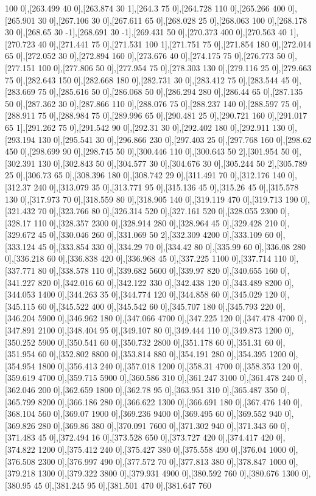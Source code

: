 {100 0],[263.499 40 0],[263.874 30 1],[264.3 75 0],[264.728 110 0],[265.266 400 0],[265.901 30 0],[267.106 30 0],[267.611 65 0],[268.028 25 0],[268.063 100 0],[268.178 30 0],[268.65 30 -1],[268.691 30 -1],[269.431 50 0],[270.373 400 0],[270.563 40 1],[270.723 40 0],[271.441 75 0],[271.531 100 1],[271.751 75 0],[271.854 180 0],[272.014 65 0],[272.052 30 0],[272.894 160 0],[273.676 40 0],[274.175 75 0],[276.773 50 0],[277.151 100 0],[277.806 50 0],[277.954 75 0],[278.303 130 0],[279.116 25 0],[279.663 75 0],[282.643 150 0],[282.668 180 0],[282.731 30 0],[283.412 75 0],[283.544 45 0],[283.669 75 0],[285.616 50 0],[286.068 50 0],[286.294 280 0],[286.44 65 0],[287.135 50 0],[287.362 30 0],[287.866 110 0],[288.076 75 0],[288.237 140 0],[288.597 75 0],[288.911 75 0],[288.984 75 0],[289.996 65 0],[290.481 25 0],[290.721 160 0],[291.017 65 1],[291.262 75 0],[291.542 90 0],[292.31 30 0],[292.402 180 0],[292.911 130 0],[293.194 130 0],[295.541 30 0],[296.866 230 0],[297.403 25 0],[297.768 160 0],[298.62 450 0],[298.699 90 0],[298.745 50 0],[300.446 110 0],[300.643 50 2],[301.954 50 0],[302.391 130 0],[302.843 50 0],[304.577 30 0],[304.676 30 0],[305.244 50 2],[305.789 25 0],[306.73 65 0],[308.396 180 0],[308.742 29 0],[311.491 70 0],[312.176 140 0],[312.37 240 0],[313.079 35 0],[313.771 95 0],[315.136 45 0],[315.26 45 0],[315.578 130 0],[317.973 70 0],[318.559 80 0],[318.905 140 0],[319.119 470 0],[319.713 190 0],[321.432 70 0],[323.766 80 0],[326.314 520 0],[327.161 520 0],[328.055 2300 0],[328.17 110 0],[328.357 2300 0],[328.914 280 0],[328.964 45 0],[329.428 210 0],[329.672 45 0],[330.046 260 0],[331.069 50 2],[332.309 4200 0],[333.109 60 0],[333.124 45 0],[333.854 330 0],[334.29 70 0],[334.42 80 0],[335.99 60 0],[336.08 280 0],[336.218 60 0],[336.838 420 0],[336.968 45 0],[337.225 1100 0],[337.714 110 0],[337.771 80 0],[338.578 110 0],[339.682 5600 0],[339.97 820 0],[340.655 160 0],[341.227 820 0],[342.016 60 0],[342.122 330 0],[342.438 120 0],[343.489 8200 0],[344.053 1400 0],[344.263 35 0],[344.774 120 0],[344.858 60 0],[345.029 120 0],[345.115 60 0],[345.522 400 0],[345.542 60 0],[345.707 180 0],[345.793 220 0],[346.204 5900 0],[346.962 180 0],[347.066 4700 0],[347.225 120 0],[347.478 4700 0],[347.891 2100 0],[348.404 95 0],[349.107 80 0],[349.444 110 0],[349.873 1200 0],[350.252 5900 0],[350.541 60 0],[350.732 2800 0],[351.178 60 0],[351.31 60 0],[351.954 60 0],[352.802 8800 0],[353.814 880 0],[354.191 280 0],[354.395 1200 0],[354.954 1800 0],[356.413 240 0],[357.018 1200 0],[358.31 4700 0],[358.353 120 0],[359.619 4700 0],[359.715 5900 0],[360.586 310 0],[361.247 3100 0],[361.478 240 0],[362.046 200 0],[362.659 1800 0],[362.78 95 0],[363.951 310 0],[365.487 350 0],[365.799 8200 0],[366.186 280 0],[366.622 1300 0],[366.691 180 0],[367.476 140 0],[368.104 560 0],[369.07 1900 0],[369.236 9400 0],[369.495 60 0],[369.552 940 0],[369.826 280 0],[369.86 380 0],[370.091 7600 0],[371.302 940 0],[371.343 60 0],[371.483 45 0],[372.494 16 0],[373.528 650 0],[373.727 420 0],[374.417 420 0],[374.822 1200 0],[375.412 240 0],[375.427 380 0],[375.558 490 0],[376.04 1000 0],[376.508 2300 0],[376.997 490 0],[377.572 70 0],[377.813 380 0],[378.847 1000 0],[379.218 1300 0],[379.322 3800 0],[379.931 4900 0],[380.592 760 0],[380.676 1300 0],[380.95 45 0],[381.245 95 0],[381.501 470 0],[381.647 760 }
